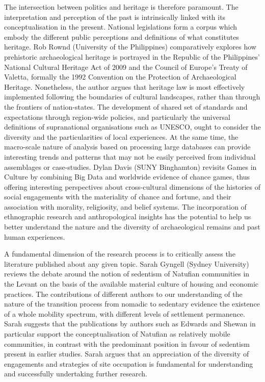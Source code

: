 The intersection between politics and heritage is therefore paramount. The interpretation and perception of the past is intrinsically linked with its conceptualisation in the present. National legislations form a corpus which embody the different public perceptions and definitions of what constitutes heritage. Rob Rownd (University of the Philippines) comparatively explores how prehistoric archaeological heritage is portrayed in the Republic of the Philippines’ National Cultural Heritage Act of 2009 and the Council of Europe’s Treaty of Valetta, formally the 1992 Convention on the Protection of Archaeological Heritage. Nonetheless, the author argues that heritage law is most effectively implemented following the boundaries of cultural landscapes, rather than through the frontiers of nation-states. The development of shared set of standards and expectations through region-wide policies, and particularly the universal definitions of supranational organisations such as UNESCO, ought to consider the diversity and the particularities of local experiences.
At the same time, the macro-scale nature of analysis based on processing large databases can provide interesting trends and patterns that may not be easily perceived from individual assemblages or case-studies. Dylan Davis (SUNY Binghamton) revisits Games in Culture by combining Big Data and worldwide evidence of chance games, thus offering interesting perspectives about cross-cultural dimensions of the histories of social engagements with the materiality of chance and fortune, and their association with morality, religiosity, and belief systems. The incorporation of ethnographic research and anthropological insights has the potential to help us better understand the nature and the diversity of archaeological remains and past human experiences.

\IJSRAseparator

A fundamental dimension of the research process is to critically assess the literature published about any given topic. Sarah Gyngell (Sydney University) reviews the debate around the notion of sedentism of Natufian communities in the Levant on the basis of the available material culture of housing and economic practices. The contributions of different authors to our understanding of the nature of the transition process from nomadic to sedentary evidence the existence of a whole mobility spectrum, with different levels of settlement permanence. Sarah suggests that the publications by authors such as Edwards and Shewan in particular support the conceptualisation of Natufian as relatively mobile communities, in contrast with the predominant position in favour of sedentism present in earlier studies. Sarah argues that an appreciation of the diversity of engagements and strategies of site occupation is fundamental for understanding and successfully undertaking further research.


